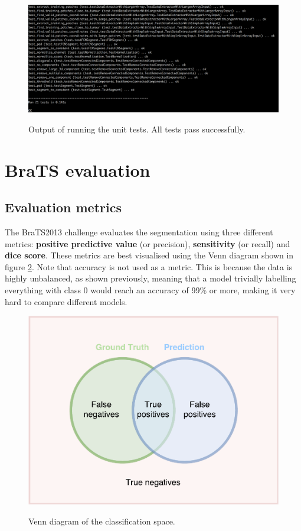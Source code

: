 \documentclass[12pt,a4paper,twoside,openright]{report}
\begin{document}
\begin{figure}[h]
	\centering
	\includegraphics[width = \textwidth]{unit_test_output}
	\label{fig:unit_test_output}
	\caption{Output of running the unit tests. All tests pass successfully.}
\end{figure}

\section{BraTS evaluation}
\subsection{Evaluation metrics}
The BraTS2013 challenge \cite{brats-proceedings} evaluates the segmentation using three different metrics: \textbf{positive predictive value} (or precision), \textbf{sensitivity} (or recall) and \textbf{dice score}. These metrics are best visualised using the Venn diagram shown in figure \ref{fig:evaluation_venn_diagram}.  Note that accuracy is not used as a metric. This is because the data is highly unbalanced, as shown previously, meaning that a model trivially labelling everything with class 0 would reach an accuracy of 99\% or more, making it very hard to compare different models.

\begin{figure}
	\centering
	\includegraphics[scale = 0.5]{evaluation_venn_diagram}
	\label{fig:evaluation_venn_diagram}
	\caption{Venn diagram of the classification space.}
\end{figure}
\end{document}
